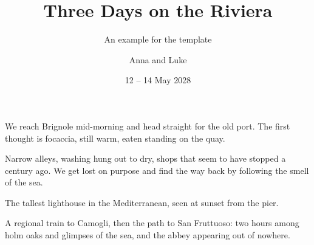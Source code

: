 \documentclass[english]{travelbook}
\title{Three Days on the Riviera}
\subtitle{An example for the template}
\author{Anna and Luke}
\date{12 – 14 May 2028}
\begin{document}
\makecover
\maketitlepage
\contentspage

\begin{itinerary}
\end{itinerary}




We reach Brignole mid-morning and head straight for the old port. The first
thought is focaccia, still warm, eaten standing on the quay.

Narrow alleys, washing hung out to dry, shops that seem to have stopped a century
ago. We get lost on purpose and find the way back by following the smell of the sea.


The tallest lighthouse in the Mediterranean, seen at sunset from the pier.



A regional train to Camogli, then the path to San Fruttuoso: two hours among holm
oaks and glimpses of the sea, and the abbey appearing out of nowhere.


\memoryfill

\end{document}
